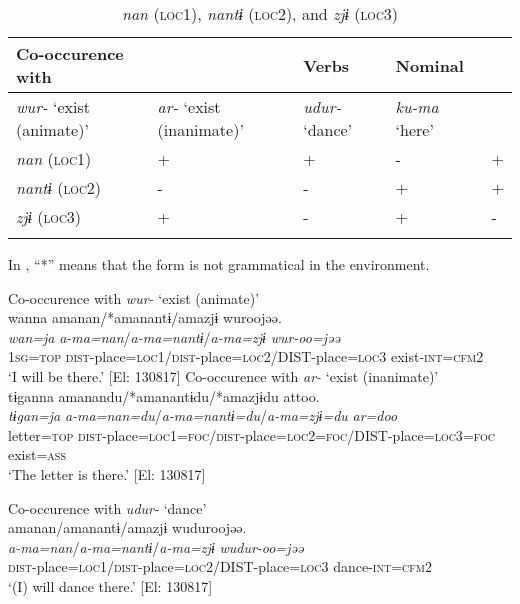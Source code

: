 \begin{table}
\caption{\label{tab:key:43} \textit{nan} (\textsc{loc1}),
                            \textit{nantɨ} (\textsc{loc2}), and
                            \textit{zjɨ} (\textsc{loc3})
                            }

\begin{tabularx}{\textwidth}{XXXXX}
\lsptoprule
Co-occurence with  && Verbs &        Nominal\\
\midrule
\textit{wur-} ‘exist (animate)’  &\textit{ar-} ‘exist (inanimate)’ & \textit{udur-} ‘dance’    &\textit{ku-ma} ‘here’\\
\textit{nan}  (\textsc{loc1})    &+ & + &  -  &  + \\
\textit{nantɨ}  (\textsc{loc2})  &- & - &  +  &  + \\
\textit{zjɨ}  (\textsc{loc3})    &+ & - &  +  &  - \\
\lspbottomrule
\end{tabularx}
\end{table}

In , “*” means that the form is not grammatical in the environment.

\ea\label{ex:6-83}
 \ea Co-occurence with \textit{wur-} ‘exist (animate)’\\

{\TM}
\glll wanna  amanan/*amanantɨ/amazjɨ  wuroojəə.\\
\textit{wan=ja}  \textit{a-ma=nan}/\textit{a-ma=nantɨ}/\textit{a-ma=zjɨ}  \textit{wur-oo=jəə}\\
    1\textsc{sg}=\textsc{top}  \textsc{dist}-place=\textsc{loc1}/\textsc{dist}-place=\textsc{loc2}/DIST-place=\textsc{loc3}  exist-\textsc{int}=\textsc{cfm}2\\
\glt    ‘I will be there.’ [El: 130817]
\ex Co-occurence with \textit{ar-} ‘exist (inanimate)’\\

{\TM}
\glll tɨganna  amanandu/*amanantɨdu/*amazjɨdu    attoo.  \\
\textit{tɨgan=ja}  \textit{a-ma=nan=du}/\textit{a-ma=nantɨ=du}/\textit{a-ma=zjɨ=du}   \textit{ar=doo}  \\
    letter=\textsc{top}  \textsc{dist}-place=\textsc{loc1}=\textsc{foc}/\textsc{dist}-place=\textsc{loc2}=\textsc{foc}/DIST-place=\textsc{loc3}=\textsc{foc}   exist=\textsc{ass}\\
\glt    ‘The letter is there.’ [El: 130817]

\ex Co-occurence with \textit{udur-} ‘dance’\\
{\TM}
\glll *amanan/amanantɨ/amazjɨ  wuduroojəə.\\
\textit{a-ma=nan}/\textit{a-ma=nantɨ}/\textit{a-ma=zjɨ}  \textit{wudur-oo=jəə}\\
    \textsc{dist}-place=\textsc{loc1}/\textsc{dist}-place=\textsc{loc2}/DIST-place=\textsc{loc3}  dance-\textsc{int}=\textsc{cfm}2\\
 \glt    ‘(I) will dance there.’ [El: 130817]
\z
\z

